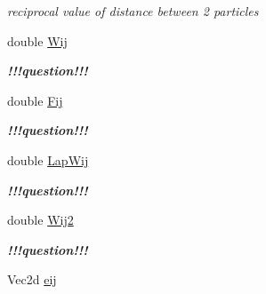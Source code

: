 \begin{CompactItemize}
\begin{CompactList}\small\item\em reciprocal value of distance between 2 particles \item\end{CompactList}\item 
\hypertarget{classInteraction_eba240d2ffdb54061f81731aa71899c5}{
double \hyperlink{classInteraction_eba240d2ffdb54061f81731aa71899c5}{Wij}}
\label{classInteraction_eba240d2ffdb54061f81731aa71899c5}

\begin{CompactList}\small\item\em {\bf !!!question!!!{\bf  }}\item\end{CompactList}\item 
\hypertarget{classInteraction_852d78e817e68e1b993728fbd82be282}{
double \hyperlink{classInteraction_852d78e817e68e1b993728fbd82be282}{Fij}}
\label{classInteraction_852d78e817e68e1b993728fbd82be282}

\begin{CompactList}\small\item\em {\bf !!!question!!!{\bf  }}\item\end{CompactList}\item 
\hypertarget{classInteraction_7c35fdb7203d62ee603c98cd85bae892}{
double \hyperlink{classInteraction_7c35fdb7203d62ee603c98cd85bae892}{LapWij}}
\label{classInteraction_7c35fdb7203d62ee603c98cd85bae892}

\begin{CompactList}\small\item\em {\bf !!!question!!!{\bf  }}\item\end{CompactList}\item 
\hypertarget{classInteraction_ab5f36ffa814690f70e996687babc39e}{
double \hyperlink{classInteraction_ab5f36ffa814690f70e996687babc39e}{Wij2}}
\label{classInteraction_ab5f36ffa814690f70e996687babc39e}

\begin{CompactList}\small\item\em {\bf !!!question!!!{\bf  }}\item\end{CompactList}\item 
\hypertarget{classInteraction_7c283bad9c22a17c44d3566eacd02705}{
Vec2d \hyperlink{classInteraction_7c283bad9c22a17c44d3566eacd02705}{eij}}
\label{classInteraction_7c283bad9c22a17c44d3566eacd02705}


\end{CompactItemize}
